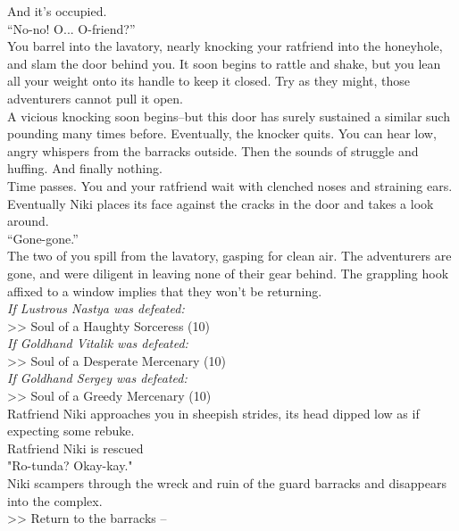 And it’s occupied.\\

“No-no! O... O-friend?”\\

You barrel into the lavatory, nearly knocking your ratfriend into the honeyhole, and slam the door behind you. It soon begins to rattle and shake, but you lean all your weight onto its handle to keep it closed. Try as they might, those adventurers cannot pull it open.\\

A vicious knocking soon begins--but this door has surely sustained a similar such pounding many times before. Eventually, the knocker quits. You can hear low, angry whispers from the barracks outside. Then the sounds of struggle and huffing. And finally nothing.\\

Time passes. You and your ratfriend wait with clenched noses and straining ears. Eventually Niki places its face against the cracks in the door and takes a look around.\\

“Gone-gone.”\\

The two of you spill from the lavatory, gasping for clean air. The adventurers are gone, and were diligent in leaving none of their gear behind. The grappling hook affixed to a window implies that they won't be returning.\\

\emph{If Lustrous Nastya was defeated:}\\
>> Soul of a Haughty Sorceress (10)\\

\emph{If Goldhand Vitalik was defeated:}\\
>> Soul of a Desperate Mercenary (10)\\

\emph{If Goldhand Sergey was defeated:}\\
>> Soul of a Greedy Mercenary (10)\\

Ratfriend Niki approaches you in sheepish strides, its head dipped low as if expecting some rebuke.\\
 Ratfriend Niki is rescued\\

"Ro-tunda? Okay-kay."\\

Niki scampers through the wreck and ruin of the guard barracks and disappears into the complex.\\

>> Return to the barracks -- 